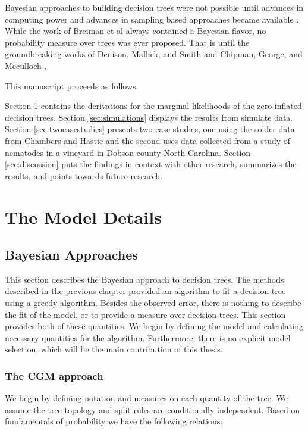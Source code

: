 \documentclass{article}
\begin{document}
Bayesian approaches to building decision trees were not possible until advances in computing power and advances in sampling based approaches became available \cite{gelfand1990sampling}. While the work of Breiman et al \cite{breiman1984classification} always contained a Bayesian flavor, no probability measure over trees was ever proposed. That is until the groundbreaking works of Denison, Mallick, and Smith \cite{denison1998bayesian} and Chipman, George, and Mcculloch \cite{chipman1998bayesian}.

This manuscript proceeds as follows: 

Section \ref{sec:derivations} contains the derivations for the marginal likelihoods of the zero-inflated decision trees. 
Section \ref{sec:simulations} displays the results from simulate data. 
Section \ref{sec:twocasestudies} presents two case studies, one using the solder data from Chambers and Hastie \cite{chambers1991statistical}  and the second uses data collected from a study of nematodes in a vineyard in Dobson county North Carolina. 
Section \ref{sec:discussion} puts the findings in context with other research, summarizes the results, and points towards future research. 

\section{The Model Details}
\label{sec:derivations}

\subsection{Bayesian Approaches}
\label{ch:p2sub_bayes}

This section describes the Bayesian approach to decision trees. The methods described in the previous chapter provided an algorithm to fit a decision tree using a greedy algorithm. Besides the observed error, there is nothing to describe the fit of the model, or to  provide a measure over decision trees. This section provides both of these quantities. We begin by defining the model and calculating necessary quantities for the algorithm. Furthermore, there is no explicit model selection, which will be the main contribution of this thesis.    

\subsubsection{The CGM approach}
We begin by defining notation and measures on each quantity of the tree. 
We assume the tree topology and split rules are conditionally independent. Based on fundamentals of probability we have the following relations:
\end{document}

